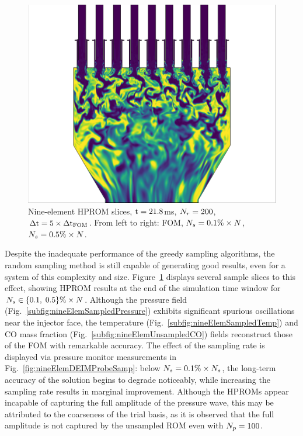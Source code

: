 \begin{figure}
{\begin{minipage}{0.32\linewidth}
		\includegraphics[width=0.99\linewidth,trim={0.5em 0.5em 15.0em 0.5em},clip]{Chapters/HPROMResults/Images/nineElem/deim/contours/deim_0p005_co_z.png}
	\end{minipage}
	}

	\caption{\label{fig:nineElemDEIMContours}Nine-element HPROM slices, $\text{t} = 21.8$ms, $N_r = 200$, $\Delta \text{t} = 5 \times \Delta \text{t}_{\text{FOM}}$. From left to right: FOM, $N_s = 0.1\% \times N$, $N_s = 0.5\% \times N$.}
\end{figure}

Despite the inadequate performance of the greedy sampling algorithms, the random sampling method is still capable of generating good results, even for a system of this complexity and size. Figure~\ref{fig:nineElemDEIMContours} displays several sample slices to this effect, showing HPROM results at the end of the simulation time window for $N_s \in \{0.1, \; 0.5 \}\% \times N$. Although the pressure field (Fig.~\ref{subfig:nineElemSampledPressure}) exhibits significant spurious oscillations near the injector face, the temperature (Fig.~\ref{subfig:nineElemSampledTemp}) and CO mass fraction (Fig.~\ref{subfig:nineElemUnsampledCO}) fields reconstruct those of the FOM with remarkable accuracy. The effect of the sampling rate is displayed via pressure monitor measurements in Fig.~\ref{fig:nineElemDEIMProbeSamp}: below $N_s = 0.1\% \times N_s$, the long-term accuracy of the solution begins to degrade noticeably, while increasing the sampling rate results in marginal improvement. Although the HPROMs appear incapable of capturing the full amplitude of the pressure wave, this may be attributed to the coarseness of the trial basis, as it is observed that the full amplitude is not captured by the unsampled ROM even with $N_p = 100$.

